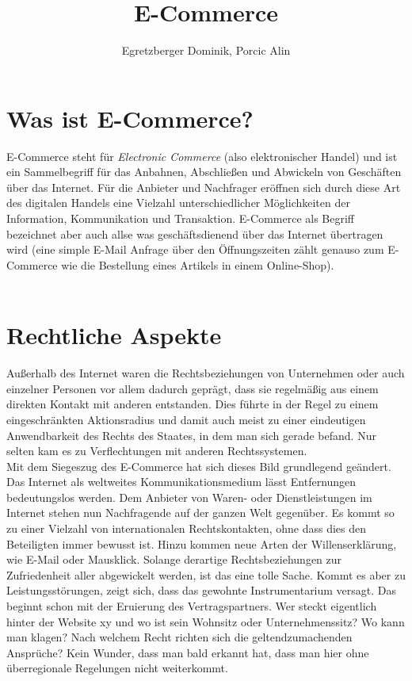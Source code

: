 \documentclass[a4paper]{article}
\author{Egretzberger Dominik, Porcic Alin}
\title{E-Commerce}
\begin{document}
 

\maketitle
\newpage

\tableofcontents
\newpage

\section{Was ist E-Commerce?}

E-Commerce steht für \textit{Electronic Commerce} (also elektronischer Handel) und ist ein Sammelbegriff für das Anbahnen, Abschließen und Abwickeln von Geschäften über das Internet. Für die Anbieter und Nachfrager eröffnen sich durch diese Art des digitalen Handels eine Vielzahl unterschiedlicher Möglichkeiten der Information, Kommunikation und Transaktion. E-Commerce als Begriff bezeichnet aber auch allse was geschäftsdienend über das Internet übertragen wird (eine simple E-Mail Anfrage über den Öffnungszeiten zählt genauso zum E-Commerce wie die Bestellung eines Artikels in einem Online-Shop).\\\\

\section{Rechtliche Aspekte}

Außerhalb des Internet waren die Rechtsbeziehungen von Unternehmen oder auch einzelner Personen vor allem dadurch geprägt, dass sie regelmäßig aus einem direkten Kontakt mit anderen entstanden. Dies führte in der Regel zu einem eingeschränkten Aktionsradius und damit auch meist zu einer eindeutigen Anwendbarkeit des Rechts des Staates, in dem man sich gerade befand. Nur selten kam es zu Verflechtungen mit anderen Rechtssystemen.\\
Mit dem Siegeszug des E-Commerce hat sich dieses Bild grundlegend geändert. Das Internet als weltweites Kommunikationsmedium lässt Entfernungen bedeutungslos werden. Dem Anbieter von Waren- oder Dienstleistungen im Internet stehen nun Nachfragende auf der ganzen Welt gegenüber. Es kommt so zu einer Vielzahl von internationalen Rechtskontakten, ohne dass dies den Beteiligten immer bewusst ist. Hinzu kommen neue Arten der Willenserklärung, wie E-Mail oder Mausklick. Solange derartige Rechtsbeziehungen zur Zufriedenheit aller abgewickelt werden, ist das eine tolle Sache. Kommt es aber zu Leistungsstörungen, zeigt sich, dass das gewohnte Instrumentarium versagt. Das beginnt schon mit der Eruierung des Vertragspartners. Wer steckt eigentlich hinter der Website xy und wo ist sein Wohnsitz oder Unternehmenssitz? Wo kann man klagen? Nach welchem Recht richten sich die geltendzumachenden Ansprüche? Kein Wunder, dass man bald erkannt hat, dass man hier ohne überregionale Regelungen nicht weiterkommt.
\end{document}
